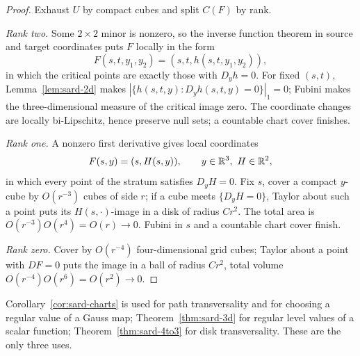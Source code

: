\begin{proof}
Exhaust $U$ by compact cubes and split $C(F)$ by rank.

\emph{Rank two.}  Some $2\times2$ minor is nonzero, so the inverse function
theorem in source and target coordinates puts $F$ locally in the form
\begin{equation}\label{eq:sard-rank2}
  F(s,t,y_1,y_2)=(s,t,h(s,t,y_1,y_2)),
\end{equation}
in which the critical points are exactly those with $D_yh=0$.  For fixed
$(s,t)$, Lemma~\ref{lem:sard-2d} makes
$|\{h(s,t,y):D_yh(s,t,y)=0\}|_1=0$; Fubini makes the three-dimensional
measure of the critical image zero.  The coordinate changes are locally
bi-Lipschitz, hence preserve null sets; a countable chart cover finishes.

\emph{Rank one.}  A nonzero first derivative gives local coordinates
\begin{equation}\label{eq:sard-rank1}
  F(s,y)=(s,H(s,y)),\qquad y\in\mathbb R^3,\ H\in\mathbb R^2,
\end{equation}
in which every point of the stratum satisfies $D_yH=0$.  Fix $s$, cover a
compact $y$-cube by $O(r^{-3})$ cubes of side $r$; if a cube meets
$\{D_yH=0\}$, Taylor about such a point puts its $H(s,\cdot)$-image in a disk
of radius $Cr^2$.  The total area is $O(r^{-3})O(r^4)=O(r)\to0$.  Fubini in
$s$ and a countable chart cover finish.

\emph{Rank zero.}  Cover by $O(r^{-4})$ four-dimensional grid cubes; Taylor
about a point with $DF=0$ puts the image in a ball of radius $Cr^2$, total
volume $O(r^{-4})O(r^6)=O(r^2)\to0$.
\end{proof}

\begin{remark}\label{rem:sard-usage}
Corollary~\ref{cor:sard-charts} is used for path transversality and for
choosing a regular value of a Gauss map; Theorem~\ref{thm:sard-3d} for regular
level values of a scalar function; Theorem~\ref{thm:sard-4to3} for disk
transversality.  These are the only three uses.
\end{remark}

